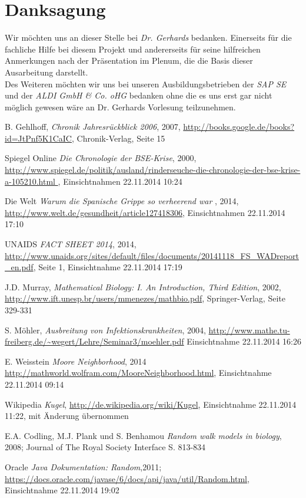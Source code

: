 \documentclass[10pt,twocolumn]{scrartcl}
\begin{document}
\section*{Danksagung}
Wir möchten uns an dieser Stelle bei \emph{Dr. Gerhards} bedanken. Einerseits für die fachliche Hilfe bei diesem Projekt und andererseits für seine hilfreichen Anmerkungen nach der Präsentation im Plenum, die die Basis dieser Ausarbeitung darstellt.\\
Des Weiteren möchten wir uns bei unseren Ausbildungsbetrieben der \emph{SAP SE} und der \emph{ALDI GmbH \& Co. oHG} bedanken ohne die es uns erst gar nicht möglich gewesen wäre an Dr. Gerhards Vorlesung teilzunehmen.



\begin{thebibliography}{99}
B. Gehlhoff,  \textit{Chronik Jahresrückblick 2006}, 2007,
\url{http://books.google.de/books?id=JtPnf5K1CaIC},
Chronik-Verlag, Seite 15


Spiegel Online {\it Die Chronologie der BSE-Krise}, 2000, \url{
	http://www.spiegel.de/politik/ausland/rinderseuche-die-chronologie-der-bse-krise-a-105210.html
}, Einsichtnahmen 22.11.2014 10:24


Die Welt {\it Warum die Spanische Grippe so verheerend war} , 2014, \url{http://www.welt.de/gesundheit/article127418306}, Einsichtnahmen 22.11.2014 17:10

	
UNAIDS {\it FACT SHEET 2014}, 2014,
	\url{http://www.unaids.org/sites/default/files/documents/20141118_FS_WADreport_en.pdf},
	Seite 1, Einsichtnahme 22.11.2014 17:19

	J.D. Murray,  \textit{Mathematical Biology: I. An Introduction, Third Edition}, 		2002, \url{http://www.ift.unesp.br/users/mmenezes/mathbio.pdf},
	Springer-Verlag, Seite 329-331

	S. Möhler,  \textit{Ausbreitung von Infektionskrankheiten}, 2004,
	\url{http://www.mathe.tu-freiberg.de/~wegert/Lehre/Seminar3/moehler.pdf}
	Einsichtnahme 22.11.2014 16:26

E. Weisstein {\it Moore Neighborhood}, 2014 \url{http://mathworld.wolfram.com/MooreNeighborhood.html}, Einsichtnahme 22.11.2014 09:14


Wikipedia {\it Kugel}, \url{http://de.wikipedia.org/wiki/Kugel}, Einsichtnahme 22.11.2014 11:22, mit Änderung übernommen


E.A. Codling, M.J. Plank und S. Benhamou {\it Random walk models in biology}, 2008; Journal of The Royal Society Interface S. 813-834

Oracle  {\it Java Dokumentation: Random},2011; \url{https://docs.oracle.com/javase/6/docs/api/java/util/Random.html}, Einsichtnahme 22.11.2014 19:02
\end{thebibliography}
\end{document}
